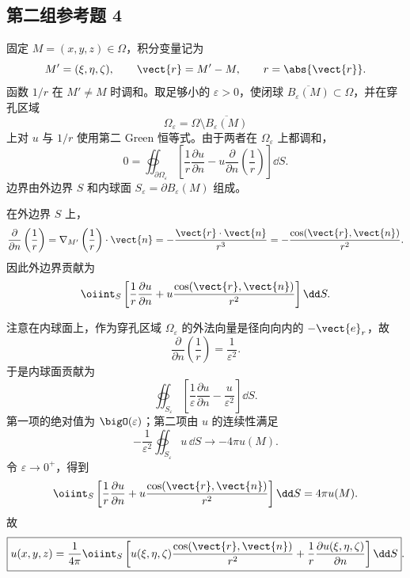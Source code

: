 \subsection*{第二组参考题 4}
\begin{xsolution}
固定 $M=(x,y,z)\in\Omega$，积分变量记为
\[
  M'=(\xi,\eta,\zeta),
  \qquad
  \vect{r}=M'-M,
  \qquad
  r=\abs{\vect{r}}.
\]
函数 $1/r$ 在 $M'\ne M$ 时调和。取足够小的 $\varepsilon>0$，使闭球 $\overline{B_\varepsilon(M)}\subset\Omega$，并在穿孔区域
\[
  \Omega_\varepsilon=\Omega\setminus\overline{B_\varepsilon(M)}
\]
上对 $u$ 与 $1/r$ 使用第二 Green 恒等式。由于两者在 $\Omega_\varepsilon$ 上都调和，
\[
  0=\oiint_{\partial\Omega_\varepsilon}\left[
  \frac1r\frac{\partial u}{\partial n}
  -u\frac{\partial}{\partial n}\left(\frac1r\right)
  \right]\dd S.
\]
边界由外边界 $S$ 和内球面 $S_\varepsilon=\partial B_\varepsilon(M)$ 组成。

在外边界 $S$ 上，
\[
  \frac{\partial}{\partial n}\left(\frac1r\right)
  =\nabla_{M'}\left(\frac1r\right)\cdot\vect{n}
  =-\frac{\vect{r}\cdot\vect{n}}{r^3}
  =-\frac{\cos(\vect{r},\vect{n})}{r^2}.
\]
因此外边界贡献为
\[
  \oiint_S\left[
  \frac1r\frac{\partial u}{\partial n}
  +u\frac{\cos(\vect{r},\vect{n})}{r^2}
  \right]\dd S.
\]

注意在内球面上，作为穿孔区域 $\Omega_\varepsilon$ 的外法向量是径向向内的 $-\vect{e}_r$，故
\[
  \frac{\partial}{\partial n}\left(\frac1r\right)=\frac1{\varepsilon^2}.
\]
于是内球面贡献为
\[
  \oiint_{S_\varepsilon}\left[
  \frac1\varepsilon\frac{\partial u}{\partial n}
  -\frac{u}{\varepsilon^2}
  \right]\dd S.
\]
第一项的绝对值为 $\bigO(\varepsilon)$；第二项由 $u$ 的连续性满足
\[
  -\frac1{\varepsilon^2}\oiint_{S_\varepsilon}u\,\dd S
  \longrightarrow-4\pi u(M).
\]
令 $\varepsilon\to0^+$，得到
\[
  \oiint_S\left[
  \frac1r\frac{\partial u}{\partial n}
  +u\frac{\cos(\vect{r},\vect{n})}{r^2}
  \right]\dd S
  =4\pi u(M).
\]
故
\[
  \boxed{
  u(x,y,z)=\frac1{4\pi}\oiint_S\left[
  u(\xi,\eta,\zeta)\frac{\cos(\vect{r},\vect{n})}{r^2}
  +\frac1r\frac{\partial u(\xi,\eta,\zeta)}{\partial n}
  \right]\dd S
  }.
\]
\end{xsolution}

